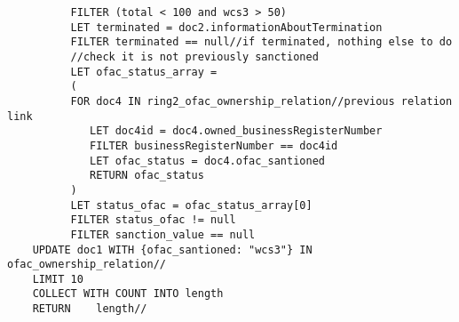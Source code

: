 \begin{enumerate}
\begin{verbatim}
	      FILTER (total < 100 and wcs3 > 50)
	      LET terminated = doc2.informationAboutTermination
	      FILTER terminated == null//if terminated, nothing else to do
	      //check it is not previously sanctioned
	      LET ofac_status_array = 
	      (
	      FOR doc4 IN ring2_ofac_ownership_relation//previous relation link
	         LET doc4id = doc4.owned_businessRegisterNumber
	         FILTER businessRegisterNumber == doc4id
	         LET ofac_status = doc4.ofac_santioned
	         RETURN ofac_status 
	      )
	      LET status_ofac = ofac_status_array[0]
	      FILTER status_ofac != null
	      FILTER sanction_value == null
	UPDATE doc1 WITH {ofac_santioned: "wcs3"} IN ofac_ownership_relation//
	LIMIT 10
	COLLECT WITH COUNT INTO length
	RETURN    length//
	\end{verbatim}
	
	
	
\end{enumerate}


